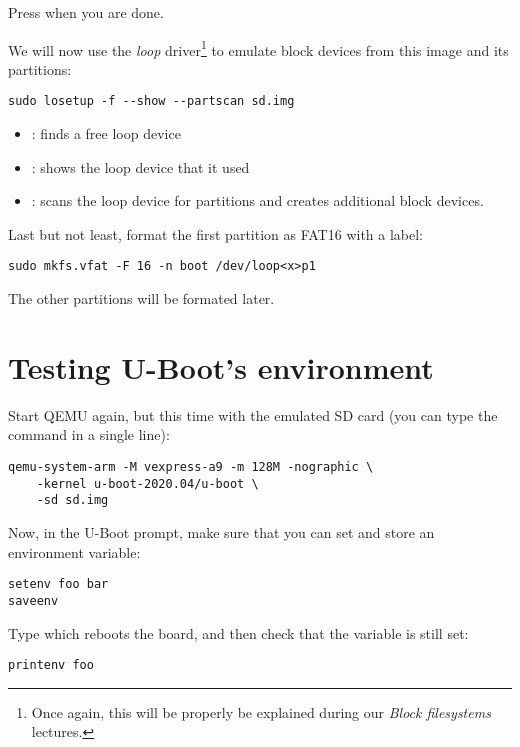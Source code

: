 Press  when you are done.

We will now use the {\em loop} driver\footnote{Once again, this will
be properly be explained during our {\em Block filesystems} lectures.}
to emulate block devices from this image and its partitions:

\begin{verbatim}
sudo losetup -f --show --partscan sd.img
\end{verbatim}

\begin{itemize}
\item {}: finds a free loop device
\item {}: shows the loop device that it used
\item {}: scans the loop device for partitions
    and creates additional  block devices.
\end{itemize}

Last but not least, format the first partition as FAT16 with
a  label:

\begin{verbatim}
sudo mkfs.vfat -F 16 -n boot /dev/loop<x>p1
\end{verbatim}

The other partitions will be formated later.

\section{Testing U-Boot's environment}

Start QEMU again, but this time with the emulated SD card
(you can type the command in a single line):

\begin{verbatim}
qemu-system-arm -M vexpress-a9 -m 128M -nographic \
	-kernel u-boot-2020.04/u-boot \
	-sd sd.img
\end{verbatim}

Now, in the U-Boot prompt, make sure that you can set and store an environment variable:

\begin{verbatim}
setenv foo bar
saveenv
\end{verbatim}

Type  which reboots the board, and then check that the
 variable is still set:

\begin{verbatim}
printenv foo
\end{verbatim}

